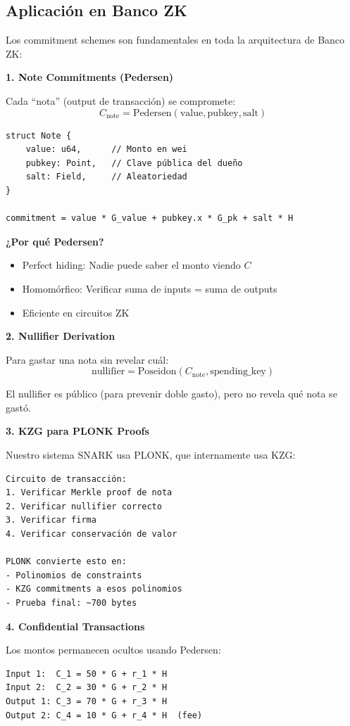 \documentclass[11pt,a4paper,twoside,openright]{book}
\theoremstyle{definition}
\theoremstyle{plain}
\theoremstyle{remark}
\begin{document}
\subsection{Aplicación en Banco ZK}

\begin{bancozk}
Los commitment schemes son fundamentales en toda la arquitectura de Banco ZK:

\textbf{1. Note Commitments (Pedersen)}

Cada ``nota'' (output de transacción) se compromete:
\[ C_{\text{note}} = \text{Pedersen}(\text{value}, \text{pubkey}, \text{salt}) \]

\begin{verbatim}
struct Note {
    value: u64,      // Monto en wei
    pubkey: Point,   // Clave pública del dueño
    salt: Field,     // Aleatoriedad
}

commitment = value * G_value + pubkey.x * G_pk + salt * H
\end{verbatim}

\textbf{¿Por qué Pedersen?}
\begin{itemize}
    \item Perfect hiding: Nadie puede saber el monto viendo $C$
    \item Homomórfico: Verificar suma de inputs = suma de outputs
    \item Eficiente en circuitos ZK
\end{itemize}

\textbf{2. Nullifier Derivation}

Para gastar una nota sin revelar cuál:
\[ \text{nullifier} = \text{Poseidon}(C_{\text{note}}, \text{spending\_key}) \]

El nullifier es público (para prevenir doble gasto), pero no revela qué nota se gastó.

\textbf{3. KZG para PLONK Proofs}

Nuestro sistema SNARK usa PLONK, que internamente usa KZG:
\begin{verbatim}
Circuito de transacción:
1. Verificar Merkle proof de nota
2. Verificar nullifier correcto
3. Verificar firma
4. Verificar conservación de valor

PLONK convierte esto en:
- Polinomios de constraints
- KZG commitments a esos polinomios
- Prueba final: ~700 bytes
\end{verbatim}

\textbf{4. Confidential Transactions}

Los montos permanecen ocultos usando Pedersen:
\begin{verbatim}
Input 1:  C_1 = 50 * G + r_1 * H
Input 2:  C_2 = 30 * G + r_2 * H
Output 1: C_3 = 70 * G + r_3 * H
Output 2: C_4 = 10 * G + r_4 * H  (fee)


\end{verbatim}
\end{bancozk}
\end{document}
